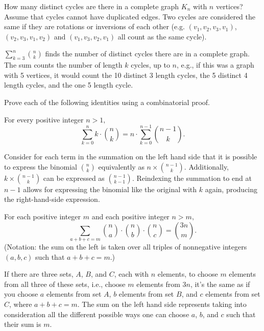 \documentclass[11pt]{article}
\begin{document}
\begin{Parts}
    \Part How many distinct cycles are there in a complete graph $K_n$ with $n$
     vertices? Assume that cycles cannot have duplicated edges. Two cycles are
     considered the same if they are rotations or inversions of each other (e.g.
     $(v_1,v_2,v_3,v_1)$, $(v_2,v_3,v_1,v_2)$ and $(v_1,v_3,v_2,v_1)$ all count as
     the same cycle).

    \begin{solution}
        $\sum_{k=3}^{n} \binom{n}{k}$ finds the number of distinct cycles there 
        are in a complete graph. The sum counts the number of length $k$ cycles, 
        up to $n$, e.g., if this was a graph with 5 vertices, it would count the 10
        distinct 3 length cycles, the 5 distinct 4 length cycles, and the one 5 length
        cycle. 
    \end{solution}
     


\end{Parts}

Prove each of the following identities using a combinatorial proof.

\begin{Parts}

\Part For every positive integer $n>1,$ 
\[\sum_{k=0}^n k \cdot \binom{n}{k} = n\cdot \sum_{k=0}^{n - 1}\binom{n - 1}{k}.\]

\begin{solution}
    Consider for each term in the summation on the left hand side that it is
    possible to express the binomial $\binom{n}{k}$ equivalently as $n\times 
    \binom{n-1}{k}$. Additionally, $k \times \binom{n-1}{k}$ can be expressed
    as $\binom{n-1}{k-1}$. Reindexing the summation to end at $n-1$ allows for
    expressing the binomial like the original with $k$ again, producing the 
    right-hand-side expression. 
\end{solution}

\Part For each positive integer $m$ and each positive integer $n > m,$
\[\sum_{a + b + c = m} \binom{n}{a}\cdot\binom{n}{b}\cdot\binom{n}{c} = \binom{3n}{m}.\]
(Notation: the sum on the left is taken over all triples of nonnegative integers 
$(a,b,c)$ such that $a + b + c = m.$)

\begin{solution}
    If there are three sets, $A$, $B$, and $C$, each with $n$ elements, to
    choose $m$ elements from all three of these sets, i.e., choose $m$ elements
    from $3n$, it's the same as if you choose $a$ elements from set $A$, $b$ 
    elements from set $B$, and $c$ elements from set $C$, where $a + b + c = m$.
    The sum on the left hand side represents taking into consideration all the 
    different possible ways one can choose $a$, $b$, and $c$ such that their
    sum is $m$.
\end{solution}

\end{Parts}
\end{document}
